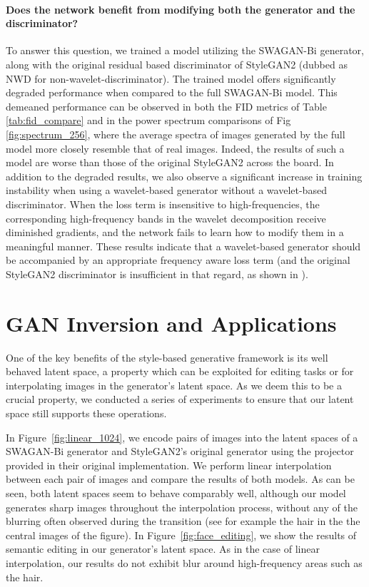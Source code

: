 \documentclass[final]{CVPR2021/cvpr}
\begin{document}
\paragraph{\bf{Does the network benefit from modifying both the generator and the discriminator?}}
To answer this question, we trained a model utilizing the SWAGAN-Bi generator, along with the original residual based discriminator of StyleGAN2 (dubbed as NWD for non-wavelet-discriminator). The trained model offers significantly degraded performance when compared to the full SWAGAN-Bi model. This demeaned performance can be observed in both the FID metrics of Table \ref{tab:fid_compare} and in the power spectrum comparisons of Fig \ref{fig:spectrum_256}, where the average spectra of images generated by the full model more closely resemble that of real images. Indeed, the results of such a model are worse than those of the original StyleGAN2 across the board.
In addition to the degraded results, we also observe a significant increase in training instability when using a wavelet-based generator without a wavelet-based discriminator. When the loss term is insensitive to high-frequencies, the corresponding high-frequency bands in the wavelet decomposition receive diminished gradients, and the network fails to learn how to modify them in a meaningful manner. These results indicate that a wavelet-based generator should be accompanied by an appropriate frequency aware loss term (and the original StyleGAN2 discriminator is insufficient in that regard, as shown in \citet{chen2020ssd}). 

\section{GAN Inversion and Applications}

One of the key benefits of the style-based generative framework is its well behaved latent space, a property which can be exploited for editing tasks or for interpolating images in the generator's latent space. As we deem this to be a crucial property, we conducted a series of experiments to ensure that our latent space still supports these operations. 

In Figure~\ref{fig:linear_1024}, we encode pairs of images into the latent spaces of a SWAGAN-Bi generator and StyleGAN2's original generator using the projector provided in their original implementation. We perform linear interpolation between each pair of images and compare the results of both models. As can be seen, both latent spaces seem to behave comparably well, although our model generates sharp images throughout the interpolation process, without any of the blurring often observed during the transition (see for example the hair in the the central images of the figure). In Figure~\ref{fig:face_editing}, we show the results of semantic editing in our generator's latent space. As in the case of linear interpolation, our results do not exhibit blur around high-frequency areas such as the hair.
\end{document}
